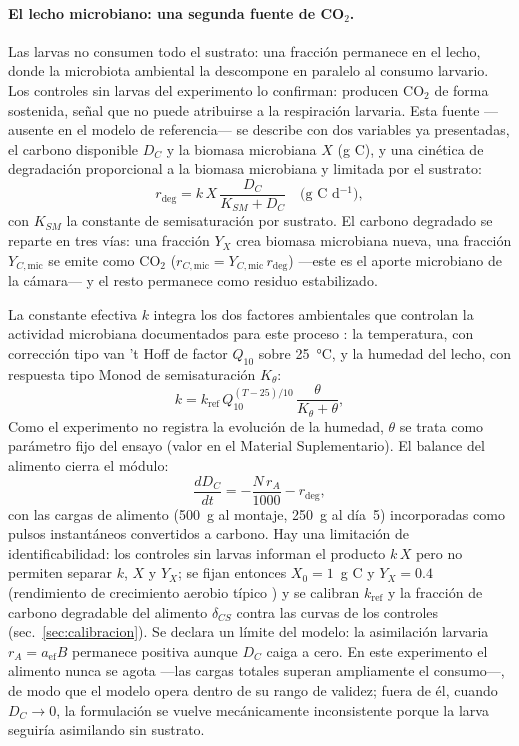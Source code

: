\paragraph{El lecho microbiano: una segunda fuente de CO$_2$.}
Las larvas no consumen todo el sustrato: una fracción permanece en el lecho, donde la microbiota ambiental la descompone en paralelo al consumo larvario. Los controles sin larvas del experimento lo confirman: producen CO$_2$ de forma sostenida, señal que no puede atribuirse a la respiración larvaria. Esta fuente ---ausente en el modelo de referencia--- se describe con dos variables ya presentadas, el carbono disponible $D_C$ y la biomasa microbiana $X$ (g C), y una cinética de degradación proporcional a la biomasa microbiana y limitada por el sustrato:
\begin{equation}
  r_{\mathrm{deg}} = k\,X\,\frac{D_C}{K_{SM} + D_C}
  \quad \text{(g C d$^{-1}$)},
  \label{eq:deg}
\end{equation}
con $K_{SM}$ la constante de semisaturación por sustrato. El carbono degradado se reparte en tres vías: una fracción $Y_X$ crea biomasa microbiana nueva, una fracción $Y_{C,\mathrm{mic}}$ se emite como CO$_2$ ($r_{C,\mathrm{mic}} = Y_{C,\mathrm{mic}}\,r_{\mathrm{deg}}$) ---este es el aporte microbiano de la cámara--- y el resto permanece como residuo estabilizado.

La constante efectiva $k$ integra los dos factores ambientales que controlan la actividad microbiana documentados para este proceso \parencite{bekkerImpactSubstrateMoisture2021a}: la temperatura, con corrección tipo van 't Hoff de factor $Q_{10}$ sobre 25~°C, y la humedad del lecho, con respuesta tipo Monod de semisaturación $K_{\theta}$:
\begin{equation}
  k = k_{\mathrm{ref}}\,Q_{10}^{(T-25)/10}\,\frac{\theta}{K_{\theta} + \theta},
  \label{eq:k-microb}
\end{equation}
Como el experimento no registra la evolución de la humedad, $\theta$ se trata como parámetro fijo del ensayo (valor en el Material Suplementario). El balance del alimento cierra el módulo:
\begin{equation}
  \frac{dD_C}{dt} = -\frac{N\,r_A}{1000} - r_{\mathrm{deg}},
  \label{eq:balanceDC}
\end{equation}
con las cargas de alimento (500~g al montaje, 250~g al día~5) incorporadas como pulsos instantáneos convertidos a carbono. Hay una limitación de identificabilidad: los controles sin larvas informan el producto $k\,X$ pero no permiten separar $k$, $X$ y $Y_X$; se fijan entonces $X_0 = 1$~g C y $Y_X = 0.4$ (rendimiento de crecimiento aerobio típico \parencite{roels1980,shulerbioprocess2017}) y se calibran $k_{\mathrm{ref}}$ y la fracción de carbono degradable del alimento $\delta_{CS}$ contra las curvas de los controles (sec.~\ref{sec:calibracion}). Se declara un límite del modelo: la asimilación larvaria $r_A = a_{\mathrm{ef}}B$ permanece positiva aunque $D_C$ caiga a cero. En este experimento el alimento nunca se agota ---las cargas totales superan ampliamente el consumo---, de modo que el modelo opera dentro de su rango de validez; fuera de él, cuando $D_C \to 0$, la formulación se vuelve mecánicamente inconsistente porque la larva seguiría asimilando sin sustrato.

